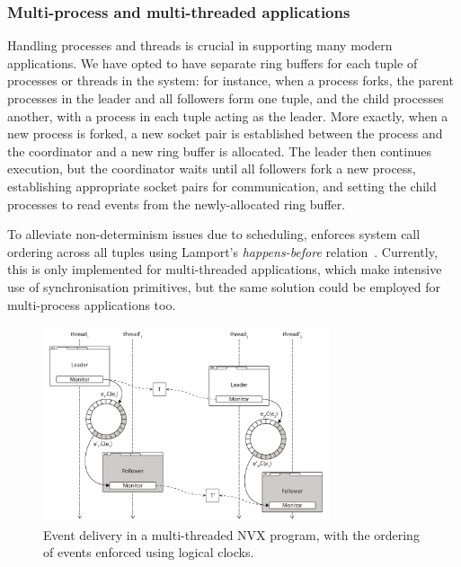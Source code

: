 

\subsubsection{Multi-process and multi-threaded applications}
\label{sec:threading}
\label{sec:ipc}

Handling processes and threads is crucial in supporting many modern
applications.  
We have opted to have separate ring buffers for each tuple of processes or
threads in the system: for instance, when a process forks, the parent processes
in the leader and all followers form one tuple, and the child processes
another, with a process in each tuple acting as the leader.  More exactly, when
a new process is forked, a new socket pair is established between the process
and the coordinator and a new ring buffer is allocated.  The leader then
continues execution, but the coordinator waits until all followers fork a new
process, establishing appropriate socket pairs for communication, and setting
the child processes to read events from the newly-allocated ring buffer.

To alleviate non-determinism issues due to scheduling, \varan enforces
system call ordering across all tuples using Lamport's
\emph{happens-before} relation~\cite{lamport78}. Currently, this is
only implemented for multi-threaded applications, which make intensive
use of synchronisation primitives, but the same solution could be
employed for multi-process applications too.

\begin{figure}[t]
  \begin{center}
    \includegraphics[width=0.75\textwidth]{efficient-execution/figures/multithreading}
    \caption{Event delivery in a multi-threaded NVX program, with
      the ordering of events enforced using logical clocks.}
    \label{fig:multithreaded}
  \end{center}
\end{figure}

